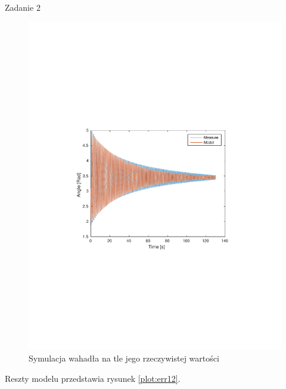 \documentclass[12pt]{article}
\begin{document}
\begin{section}{Zadanie 2}
    \begin{figure}[!htb]
      \begin{center}
        \includegraphics[width=14cm,trim=3cm 8.5cm 3cm 9cm,clip]
        {../res/img/est12.pdf}
      \end{center}
      \caption{Symulacja wahadła na tle jego rzeczywistej wartości}
      \label{plot:est12}
    \end{figure}
    
    Reszty modelu przedstawia rysunek \ref{plot:err12}.


\end{section}
\end{document}
